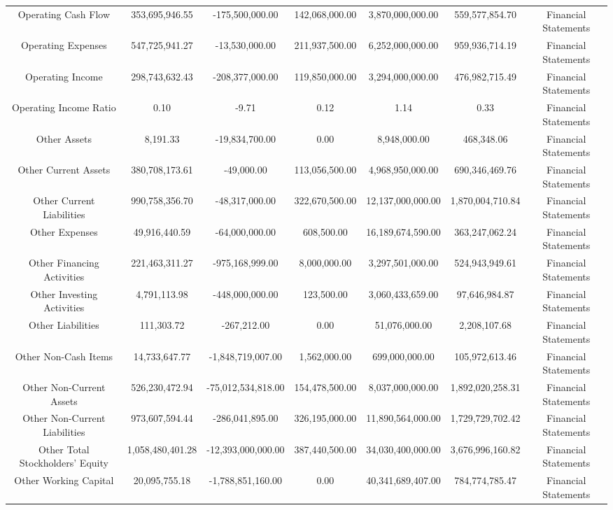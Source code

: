 \begin{longtable}{ccccccc}
Operating Cash Flow & 353,695,946.55 & -175,500,000.00 & 142,068,000.00 & 3,870,000,000.00 & 559,577,854.70 & Financial Statements \\
Operating Expenses & 547,725,941.27 & -13,530,000.00 & 211,937,500.00 & 6,252,000,000.00 & 959,936,714.19 & Financial Statements \\
Operating Income & 298,743,632.43 & -208,377,000.00 & 119,850,000.00 & 3,294,000,000.00 & 476,982,715.49 & Financial Statements \\
Operating Income Ratio & 0.10 & -9.71 & 0.12 & 1.14 & 0.33 & Financial Statements \\
Other Assets & 8,191.33 & -19,834,700.00 & 0.00 & 8,948,000.00 & 468,348.06 & Financial Statements \\
Other Current Assets & 380,708,173.61 & -49,000.00 & 113,056,500.00 & 4,968,950,000.00 & 690,346,469.76 & Financial Statements \\
Other Current Liabilities & 990,758,356.70 & -48,317,000.00 & 322,670,500.00 & 12,137,000,000.00 & 1,870,004,710.84 & Financial Statements \\
Other Expenses & 49,916,440.59 & -64,000,000.00 & 608,500.00 & 16,189,674,590.00 & 363,247,062.24 & Financial Statements \\
Other Financing Activities & 221,463,311.27 & -975,168,999.00 & 8,000,000.00 & 3,297,501,000.00 & 524,943,949.61 & Financial Statements \\
Other Investing Activities & 4,791,113.98 & -448,000,000.00 & 123,500.00 & 3,060,433,659.00 & 97,646,984.87 & Financial Statements \\
Other Liabilities & 111,303.72 & -267,212.00 & 0.00 & 51,076,000.00 & 2,208,107.68 & Financial Statements \\
Other Non-Cash Items & 14,733,647.77 & -1,848,719,007.00 & 1,562,000.00 & 699,000,000.00 & 105,972,613.46 & Financial Statements \\
Other Non-Current Assets & 526,230,472.94 & -75,012,534,818.00 & 154,478,500.00 & 8,037,000,000.00 & 1,892,020,258.31 & Financial Statements \\
Other Non-Current Liabilities & 973,607,594.44 & -286,041,895.00 & 326,195,000.00 & 11,890,564,000.00 & 1,729,729,702.42 & Financial Statements \\
Other Total Stockholders' Equity & 1,058,480,401.28 & -12,393,000,000.00 & 387,440,500.00 & 34,030,400,000.00 & 3,676,996,160.82 & Financial Statements \\
Other Working Capital & 20,095,755.18 & -1,788,851,160.00 & 0.00 & 40,341,689,407.00 & 784,774,785.47 & Financial Statements \\

\end{longtable}

